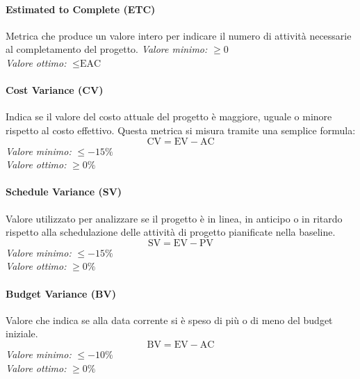 \paragraph{Estimated to Complete (ETC)}
Metrica che produce un valore intero per indicare il numero di attività necessarie al completamento del progetto.
\textit{Valore minimo:} $\ge 0$\\
\textit{Valore ottimo:} $\le \text{EAC}$
\paragraph{Cost Variance (CV)}
Indica se il valore del costo attuale del progetto è maggiore, uguale o minore rispetto al costo effettivo.
Questa metrica si misura tramite una semplice formula:
\begin{equation*}
\text{CV}=\text{EV}-\text{AC}
\end{equation*}
\textit{Valore minimo:} $\le -15\%$\\
\textit{Valore ottimo:} $\ge 0\%$
\paragraph{Schedule Variance (SV)}
Valore utilizzato per analizzare se il progetto è in linea, in anticipo o in ritardo rispetto alla schedulazione delle attività di progetto pianificate nella baseline.
\begin{equation*}
\text{SV}=\text{EV}-\text{PV}
\end{equation*}
\textit{Valore minimo:} $\le -15\%$\\
\textit{Valore ottimo:} $\ge 0\%$
\paragraph{Budget Variance (BV)}
Valore che indica se alla data corrente si è speso di più o di meno del budget iniziale.
\begin{equation*}
\text{BV}=\text{EV}-\text{AC}
\end{equation*}
\textit{Valore minimo:} $\le -10\%$\\
\textit{Valore ottimo:} $\ge 0\%$

